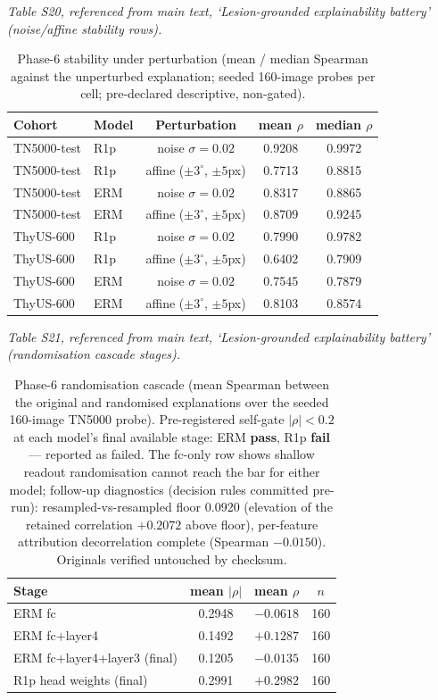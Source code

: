 \documentclass[11pt]{article}
\begin{document}
\noindent\emph{Table S20, referenced from main text, `Lesion-grounded explainability battery' (noise/affine stability rows).}

\begin{table}[!ht]
\centering\small
\caption{Phase-6 stability under perturbation (mean / median Spearman
against the unperturbed explanation; seeded 160-image probes per cell;
pre-declared descriptive, non-gated).}
\label{tab:phase6_stability}
\begin{tabular}{llccc}
\toprule
Cohort & Model & Perturbation & mean $\rho$ & median $\rho$ \\
\midrule
TN5000-test & R1p & noise $\sigma{=}0.02$  & 0.9208 & 0.9972 \\
TN5000-test & R1p & affine ($\pm 3^{\circ}$, $\pm 5$px) & 0.7713 & 0.8815 \\
TN5000-test & ERM & noise $\sigma{=}0.02$  & 0.8317 & 0.8865 \\
TN5000-test & ERM & affine ($\pm 3^{\circ}$, $\pm 5$px) & 0.8709 & 0.9245 \\
ThyUS-600   & R1p & noise $\sigma{=}0.02$  & 0.7990 & 0.9782 \\
ThyUS-600   & R1p & affine ($\pm 3^{\circ}$, $\pm 5$px) & 0.6402 & 0.7909 \\
ThyUS-600   & ERM & noise $\sigma{=}0.02$  & 0.7545 & 0.7879 \\
ThyUS-600   & ERM & affine ($\pm 3^{\circ}$, $\pm 5$px) & 0.8103 & 0.8574 \\
\bottomrule
\end{tabular}
\end{table}

\noindent\emph{Table S21, referenced from main text, `Lesion-grounded explainability battery' (randomisation cascade stages).}

\begin{table}[!ht]
\centering\small
\caption{Phase-6 randomisation cascade (mean Spearman between the
original and randomised explanations over the seeded 160-image TN5000
probe). Pre-registered self-gate $|\rho|{<}0.2$ at each model's final
available stage: ERM \textbf{pass}, R1p \textbf{fail} --- reported as
failed. The fc-only row shows shallow readout randomisation cannot reach
the bar for either model; follow-up diagnostics (decision rules
committed pre-run): resampled-vs-resampled floor 0.0920 (elevation of
the retained correlation $+0.2072$ above floor), per-feature attribution
decorrelation complete (Spearman $-0.0150$). Originals verified
untouched by checksum.}
\label{tab:phase6_cascade}
\begin{tabular}{lccc}
\toprule
Stage & mean $|\rho|$ & mean $\rho$ & $n$ \\
\midrule
ERM fc                          & 0.2948 & $-0.0618$ & 160 \\
ERM fc+layer4                   & 0.1492 & $+0.1287$ & 160 \\
ERM fc+layer4+layer3 (final)    & 0.1205 & $-0.0135$ & 160 \\
R1p head weights (final)        & 0.2991 & $+0.2982$ & 160 \\
\bottomrule
\end{tabular}
\end{table}
\end{document}
